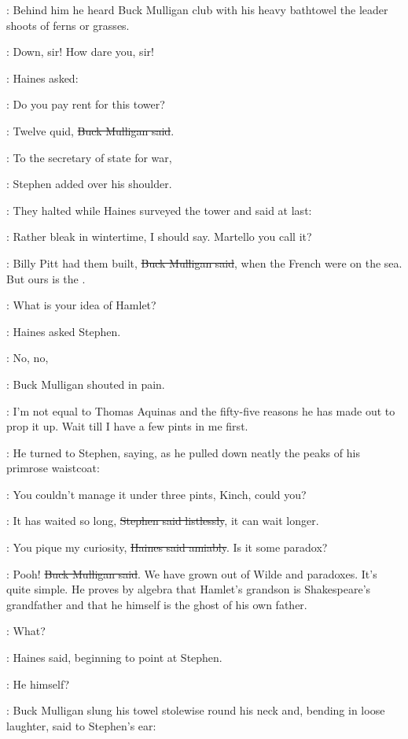 :
Behind him he heard Buck Mulligan club with his heavy bathtowel
the leader shoots of ferns or grasses.

\Mulligan:
Down, sir! How dare you, sir!

:
Haines asked:

\Haines:
Do you pay rent for this tower?

\Mulligan:
Twelve quid,
\sout{Buck Mulligan said}.

\Stephen:
To the secretary of state for war,

:
Stephen added over his shoulder.

:
They halted while Haines surveyed the tower and said at last:

\Haines:
Rather bleak in wintertime,
I should say.
Martello you call it?

\Mulligan:
Billy Pitt had them built,
\sout{Buck Mulligan said},
when the French were on the sea.
But ours is the .

\Haines:
What is your idea of Hamlet?

:
Haines asked Stephen.

\Mulligan:
No, no,

:
Buck Mulligan shouted in pain.

\Mulligan:
I'm not equal to Thomas Aquinas
and the fifty-five reasons he has made out to prop it up.
Wait till I have a few pints in me first.

:
He turned to Stephen,
saying,
as he pulled down neatly the peaks of his primrose waistcoat:

\Mulligan:
You couldn't manage it under three pints,
Kinch,
could you?

\Stephen:
It has waited so long,
\sout{Stephen said listlessly},
it can wait longer.

\Haines:
You pique my curiosity,
\sout{Haines said amiably}.
Is it some paradox?

\Mulligan:
Pooh!
\sout{Buck Mulligan said}.
We have grown out of Wilde and paradoxes.
It's quite simple.
He proves by algebra that Hamlet's grandson is Shakespeare's grandfather
and that he himself is the ghost of his own father.

\Haines:
What?

:
Haines said,
beginning to point at Stephen.

\Haines:
He himself?


:
Buck Mulligan slung his towel stolewise round his neck
and, bending in loose laughter,
said to Stephen's ear:

